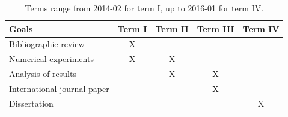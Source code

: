 \documentclass[a4,useAMS,usenatbib,usegraphicx,12pt]{article}
\begin{document}
\begin{table}[h]
\begin{flushleft}
\begin{center}
  \begin{tabular}{l  c c c c } \hline\hline
	\centering\textbf{Goals} & \textbf{Term I} & \textbf{Term II} & 
	\textbf{Term III} & \textbf{Term IV} \\ \hline\hline
	
	 Bibliographic review & X & & & \\
	 Numerical experiments & X & X & & \\
	 Analysis of results &  & X & X & \\
	 International journal paper &  &  & X & \\
	 Dissertation &  &  &  & X \\
	\hline\hline
  \end{tabular}  
  \caption{ Terms range from 2014-02 for term I, up to 2016-01 for term IV.}
\end{center}
\end{flushleft}
\end{table}



\renewcommand{\bibname}{11\ \ \ \ Bibliography}
\small

\end{document}
